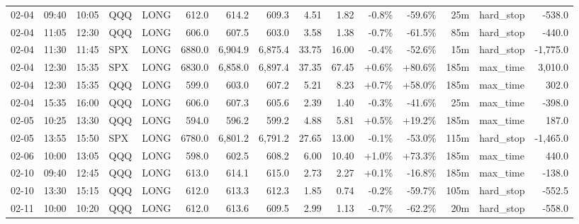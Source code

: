 \documentclass[11pt,a4paper,twoside]{article}
\begin{document}
\begin{landscape}
\begin{center}
\begin{longtable}{>{\color{txtmain}}l l l l l r r r r r r r r >{\color{txtmain}}l r}
02-04 & 09:40 & 10:05 & QQQ & LONG & 612.0 & 614.2 & 609.3 & 4.51 & 1.82 & \textcolor{lossred}{-0.8\%} & \textcolor{lossred}{-59.6\%} & 25m & hard\_stop & \textcolor{lossred}{-538.0} \\
02-04 & 11:05 & 12:30 & QQQ & LONG & 606.0 & 607.5 & 603.0 & 3.58 & 1.38 & \textcolor{lossred}{-0.7\%} & \textcolor{lossred}{-61.5\%} & 85m & hard\_stop & \textcolor{lossred}{-440.0} \\
02-04 & 11:30 & 11:45 & SPX & LONG & 6880.0 & 6,904.9 & 6,875.4 & 33.75 & 16.00 & \textcolor{lossred}{-0.4\%} & \textcolor{lossred}{-52.6\%} & 15m & hard\_stop & \textcolor{lossred}{-1,775.0} \\
02-04 & 12:30 & 15:35 & SPX & LONG & 6830.0 & 6,858.0 & 6,897.4 & 37.35 & 67.45 & \textcolor{wingreen}{+0.6\%} & \textcolor{wingreen}{+80.6\%} & 185m & max\_time & \textcolor{wingreen}{3,010.0} \\
02-04 & 12:30 & 15:35 & QQQ & LONG & 599.0 & 603.0 & 607.2 & 5.21 & 8.23 & \textcolor{wingreen}{+0.7\%} & \textcolor{wingreen}{+58.0\%} & 185m & max\_time & \textcolor{wingreen}{302.0} \\
02-04 & 15:35 & 16:00 & QQQ & LONG & 606.0 & 607.3 & 605.6 & 2.39 & 1.40 & \textcolor{lossred}{-0.3\%} & \textcolor{lossred}{-41.6\%} & 25m & max\_time & \textcolor{lossred}{-398.0} \\
02-05 & 10:25 & 13:30 & QQQ & LONG & 594.0 & 596.2 & 599.2 & 4.88 & 5.81 & \textcolor{wingreen}{+0.5\%} & \textcolor{wingreen}{+19.2\%} & 185m & max\_time & \textcolor{wingreen}{187.0} \\
02-05 & 13:55 & 15:50 & SPX & LONG & 6780.0 & 6,801.2 & 6,791.2 & 27.65 & 13.00 & \textcolor{lossred}{-0.1\%} & \textcolor{lossred}{-53.0\%} & 115m & hard\_stop & \textcolor{lossred}{-1,465.0} \\
02-06 & 10:00 & 13:05 & QQQ & LONG & 598.0 & 602.5 & 608.2 & 6.00 & 10.40 & \textcolor{wingreen}{+1.0\%} & \textcolor{wingreen}{+73.3\%} & 185m & max\_time & \textcolor{wingreen}{440.0} \\
02-10 & 09:40 & 12:45 & QQQ & LONG & 613.0 & 614.1 & 615.0 & 2.73 & 2.27 & \textcolor{wingreen}{+0.1\%} & \textcolor{lossred}{-16.8\%} & 185m & max\_time & \textcolor{lossred}{-138.0} \\
02-10 & 13:30 & 15:15 & QQQ & LONG & 612.0 & 613.3 & 612.3 & 1.85 & 0.74 & \textcolor{lossred}{-0.2\%} & \textcolor{lossred}{-59.7\%} & 105m & hard\_stop & \textcolor{lossred}{-552.5} \\
02-11 & 10:00 & 10:20 & QQQ & LONG & 612.0 & 613.6 & 609.5 & 2.99 & 1.13 & \textcolor{lossred}{-0.7\%} & \textcolor{lossred}{-62.2\%} & 20m & hard\_stop & \textcolor{lossred}{-558.0} \\

\end{longtable}
\end{center}
\end{landscape}
\end{document}
